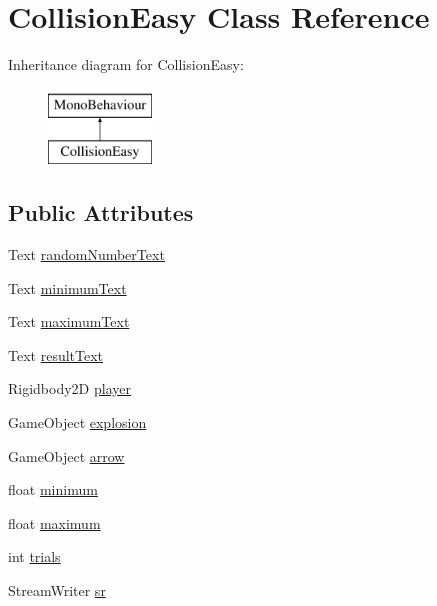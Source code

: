 \hypertarget{classCollisionEasy}{}\section{Collision\+Easy Class Reference}
\label{classCollisionEasy}
Inheritance diagram for Collision\+Easy\+:\begin{figure}[H]
\begin{center}
\leavevmode
\includegraphics[height=2.000000cm]{classCollisionEasy}
\end{center}
\end{figure}
\subsection*{Public Attributes}
\begin{DoxyCompactItemize}
\item 
Text \hyperlink{classCollisionEasy_aec8ec86eafd4a622f063dc30dd2c1fc6}{random\+Number\+Text}
\item 
Text \hyperlink{classCollisionEasy_a5a79194921d5ba449dfde562b485dbee}{minimum\+Text}
\item 
Text \hyperlink{classCollisionEasy_a71c448a39bc8a3275e1c2ea8894103cf}{maximum\+Text}
\item 
Text \hyperlink{classCollisionEasy_acf1bc5f94e12c28c9ada2dee74fc9941}{result\+Text}
\item 
Rigidbody2D \hyperlink{classCollisionEasy_ad1a20899a715866bfa3596e43319a68c}{player}
\item 
Game\+Object \hyperlink{classCollisionEasy_a1aeb22c3c5cf0b234ab55745af5fbdc7}{explosion}
\item 
Game\+Object \hyperlink{classCollisionEasy_ac86c0e5618df773cbb8516c22ecb2941}{arrow}
\item 
float \hyperlink{classCollisionEasy_a000355ff3838861ed4af4beb8402594d}{minimum}
\item 
float \hyperlink{classCollisionEasy_af6a130575edb8de45c134a37c78326ee}{maximum}
\item 
int \hyperlink{classCollisionEasy_a0e9884e63dd36eb3ae64f64864a507bd}{trials}
\item 
Stream\+Writer \hyperlink{classCollisionEasy_ac53892008e4217f5917f1145f14ef5a1}{sr}
\end{DoxyCompactItemize}
